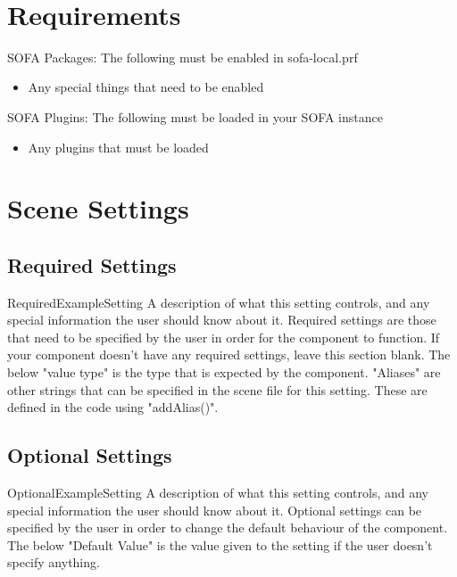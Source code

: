 \
\section{Requirements}

SOFA Packages:
The following must be enabled in sofa-local.prf
\begin{itemize}
\item Any special things that need to be enabled
\end{itemize}

SOFA Plugins:
The following must be loaded in your SOFA instance
\begin{itemize}
\item Any plugins that must be loaded
\end{itemize}

\section{Scene Settings}

\subsection{Required Settings}

\begin{componentoption}{RequiredExampleSetting}
A description of what this setting controls, and any special information the user should know about it. Required settings are those that need to be specified by the user in order for the component to function. If your component doesn't have any required settings, leave this section blank. The below "value type" is the type that is expected by the component. "Aliases" are other strings that can be specified in the scene file for this setting. These are defined in the code using "addAlias()".
\valuetype{string}
\end{componentoption}


\subsection{Optional Settings}

\begin{componentoption}{OptionalExampleSetting}
A description of what this setting controls, and any special information the user should know about it. Optional settings can be specified by the user in order to change the default behaviour of the component. The below "Default Value" is the value given to the setting if the user doesn't specify anything.
\valuetype{bool}
\end{componentoption}

